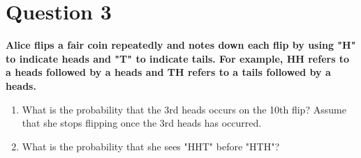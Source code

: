 \documentclass[11pt]{article}
\begin{document}
\clearpage
\section*{Question 3}

    \textbf{Alice flips a fair coin repeatedly and notes down each flip by using "H" to indicate heads and "T" to indicate tails. For example, HH refers to a heads followed by a heads and TH refers to a tails followed by a heads.}
    \begin{enumerate}[label=(\alph*)]
        \item What is the probability that the 3rd heads occurs on the 10th flip? Assume that she stops flipping once the 3rd heads has occurred.
        \item What is the probability that she sees "HHT" before "HTH"?
    \end{enumerate}
\end{document}
